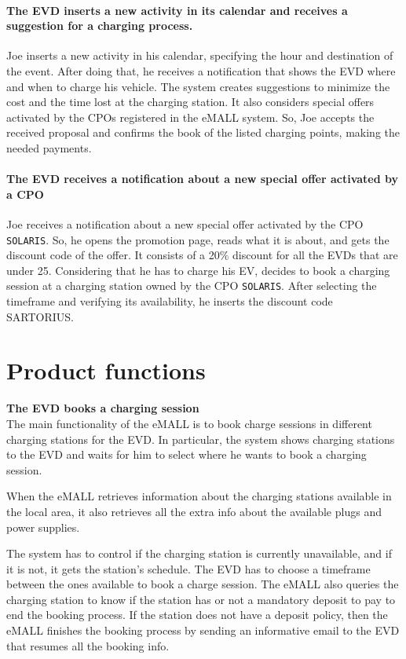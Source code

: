 \paragraph{The EVD inserts a new activity in its calendar and receives a suggestion for a charging process.}
Joe inserts a new activity in his calendar, specifying the hour and destination of the event.
After doing that, he receives a notification that shows the EVD where and when to charge his vehicle.
The system creates suggestions to minimize the cost and the time lost at the charging station.
It also considers special offers activated by the CPOs registered in the eMALL system.
So, Joe accepts the received proposal and confirms the book of the listed charging points, making the needed payments.

\paragraph{The EVD receives a notification about a new special offer activated by a CPO}
Joe receives a notification about a new special offer activated by the CPO \verb|SOLARIS|.
So, he opens the promotion page, reads what it is about, and gets the discount code of the offer.
It consists of a 20\% discount for all the EVDs that are under 25.
Considering that he has to charge his EV, decides to book a charging session at a charging station owned by the CPO \verb|SOLARIS|.
After selecting the timeframe and verifying its availability, he inserts the discount code SARTORIUS\@.


\section{Product functions}
\label{sec:product_functions}%
\textbf{The EVD books a charging session} \\
The main functionality of the eMALL is to book charge sessions in different charging stations for the EVD\@.
In particular, the system shows charging stations to the EVD and waits for him to select where he wants to book a charging session.

When the eMALL retrieves information about the charging stations available in the local area, it also retrieves all the extra info about the available plugs and power supplies.

The system has to control if the charging station is currently unavailable, and if it is not, it gets the station's schedule.
The EVD has to choose a timeframe between the ones available to book a charge session.
The eMALL also queries the charging station to know if the station has or not a mandatory deposit to pay to end the booking process.
If the station does not have a deposit policy, then the eMALL finishes the booking process by sending an informative email to the EVD that resumes all the booking info.

